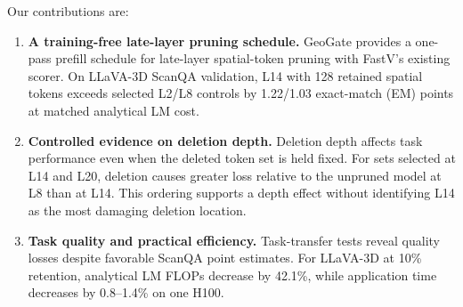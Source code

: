 Our contributions are:
\begin{enumerate}
\item \textbf{A training-free late-layer pruning schedule.} GeoGate provides a one-pass prefill schedule for late-layer spatial-token pruning with FastV's existing scorer. On LLaVA-3D ScanQA validation, L14 with 128 retained spatial tokens exceeds selected L2/L8 controls by 1.22/1.03 exact-match (EM) points at matched analytical LM cost.
\item \textbf{Controlled evidence on deletion depth.} Deletion depth affects task performance even when the deleted token set is held fixed. For sets selected at L14 and L20, deletion causes greater loss relative to the unpruned model at L8 than at L14. This ordering supports a depth effect without identifying L14 as the most damaging deletion location.
\item \textbf{Task quality and practical efficiency.} Task-transfer tests reveal quality losses despite favorable ScanQA point estimates. For LLaVA-3D at 10\% retention, analytical LM FLOPs decrease by 42.1\%, while application time decreases by 0.8--1.4\% on one H100.
\end{enumerate}
